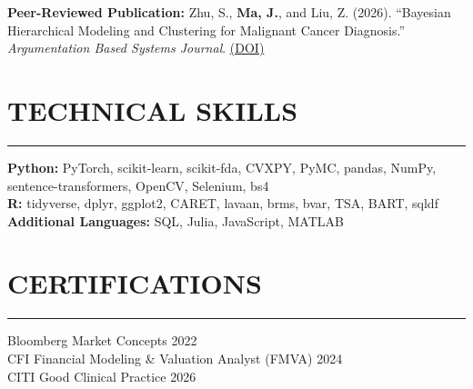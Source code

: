 \documentclass[10pt]{article}
\newcommand{\resheading}[1]{%
  \section*{#1}\vspace{-4pt}\color{rulegray}\hrule\vspace{4pt}\color{black}
}
\begin{document}
\vspace{2pt}
\textbf{Peer-Reviewed Publication:} Zhu, S., \textbf{Ma, J.}, and Liu, Z. (2026). ``Bayesian Hierarchical Modeling and Clustering for Malignant Cancer Diagnosis.'' \textit{Argumentation Based Systems Journal}. \href{https://doi.org/10.59543/w22sya71}{(DOI)}

\resheading{TECHNICAL SKILLS}

\textbf{Python:} PyTorch, scikit-learn, scikit-fda, CVXPY, PyMC, pandas, NumPy, sentence-transformers, OpenCV, Selenium, bs4 \\
\textbf{R:} tidyverse, dplyr, ggplot2, CARET, lavaan, brms, bvar, TSA, BART, sqldf \\
\textbf{Additional Languages:} SQL, Julia, JavaScript, MATLAB

\resheading{CERTIFICATIONS}

Bloomberg Market Concepts \hfill 2022\\
CFI Financial Modeling \& Valuation Analyst (FMVA) \hfill 2024\\
CITI Good Clinical Practice \hfill 2026
\end{document}
